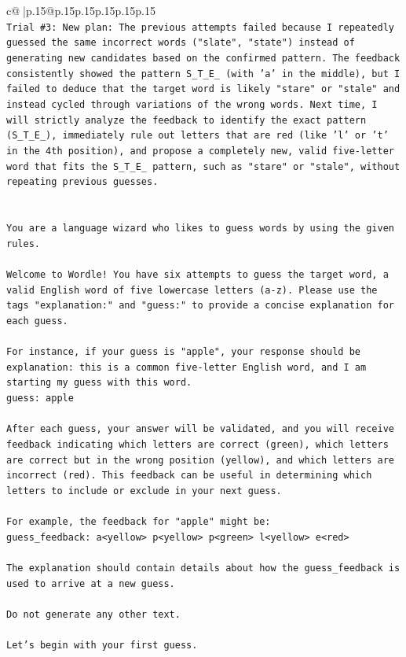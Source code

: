 \documentclass{article}
\begin{document}
{\begin{supertabular}{c@{$\;$}|p{.15\linewidth}@{}p{.15\linewidth}p{.15\linewidth}p{.15\linewidth}p{.15\linewidth}p{.15\linewidth}}
{{{\\ 
\texttt{Trial \#3: New plan: The previous attempts failed because I repeatedly guessed the same incorrect words ("slate", "state") instead of generating new candidates based on the confirmed pattern. The feedback consistently showed the pattern S\_T\_E\_ (with 'a' in the middle), but I failed to deduce that the target word is likely "stare" or "stale" and instead cycled through variations of the wrong words. Next time, I will strictly analyze the feedback to identify the exact pattern (S\_T\_E\_), immediately rule out letters that are red (like 'l' or 't' in the 4th position), and propose a completely new, valid five{-}letter word that fits the S\_T\_E\_ pattern, such as "stare" or "stale", without repeating previous guesses.} \\
\\ 
\\ 
\texttt{You are a language wizard who likes to guess words by using the given rules.} \\
\\ 
\texttt{Welcome to Wordle! You have six attempts to guess the target word, a valid English word of five lowercase letters (a{-}z). Please use the tags "explanation:" and "guess:" to provide a concise explanation for each guess.} \\
\\ 
\texttt{For instance, if your guess is "apple", your response should be} \\
\texttt{explanation: this is a common five{-}letter English word, and I am starting my guess with this word.} \\
\texttt{guess: apple} \\
\\ 
\texttt{After each guess, your answer will be validated, and you will receive feedback indicating which letters are correct (green), which letters are correct but in the wrong position (yellow), and which letters are incorrect (red). This feedback can be useful in determining which letters to include or exclude in your next guess.} \\
\\ 
\texttt{For example, the feedback for "apple" might be:} \\
\texttt{guess\_feedback: a<yellow> p<yellow> p<green> l<yellow> e<red>} \\
\\ 
\texttt{The explanation should contain details about how the guess\_feedback is used to arrive at a new guess.} \\
\\ 
\texttt{Do not generate any other text.} \\
\\ 
\texttt{Let's begin with your first guess.} \\
            }
        }
    }
     \\ \\


\end{supertabular}}
\end{document}
